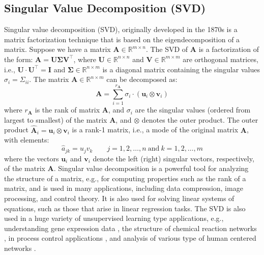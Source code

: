 \documentclass{article}[11pt]
\def\R{\mathbb{R}}
\begin{document}
\subsection{Singular Value Decomposition (SVD)}
Singular value decomposition (SVD), originally developed in the 1870s \citep{Stewart:1993} is a matrix factorization technique that is based on the eigendecomposition of a matrix.
Suppose we have a matrix $\mathbf{A} \in \R^{m \times n}$. The SVD of $\mathbf{A}$ is a factorization of the form: $\mathbf{A} = \mathbf{U}\mathbf{\Sigma}\mathbf{V}^{\top}$, where
$\mathbf{U}\in\mathbb{R}^{n\times{n}}$ and $\mathbf{V}\in\mathbb{R}^{m\times{m}}$ are orthogonal matrices, i.e., $\mathbf{U}\cdot\mathbf{U}^{\top} = \mathbf{I}$ and $\mathbf{\Sigma}\in\mathbb{R}^{n\times{m}}$ is a diagonal matrix containing 
the singular values $\sigma_{i}=\Sigma_{ii}$. The matrix $\mathbf{A}\in\mathbb{R}^{n\times{m}}$ can be decomposed as:
\begin{equation}
\mathbf{A} = \sum_{i=1}^{r_{\mathbf{A}}}\sigma_{i}\cdot\left(\mathbf{u}_{i}\otimes\mathbf{v}_{i}\right)
\end{equation}
where $r_{\mathbf{A}}$ is the rank of matrix $\mathbf{A}$, and $\sigma_{i}$ are the singular values (ordered from largest to smallest) of the matrix $\mathbf{A}$,
and $\otimes$ denotes the outer product. 
The outer product $\hat{\mathbf{A}}_{i} = \mathbf{u}_{i}\otimes\mathbf{v}_{i}$ is a rank-1 matrix, i.e., a mode of the original matrix $\mathbf{A}$,  with elements: 
\begin{equation}
\hat{a}_{jk} = u_{j}v_{k}\qquad{j=1,2,\dots,n~\text{and}~k=1,2,\dots,m}
\end{equation}
where the vectors $\mathbf{u}_{i}$ and $\mathbf{v}_{i}$ denote the left (right) singular vectors, respectively, of the matrix $\mathbf{A}$.
Singular value decomposition is a powerful tool for analyzing the structure of a matrix, e.g., for computing properties such as the rank of a matrix, and is used in many applications, 
including data compression, image processing, and control theory. It is also used for solving linear systems of equations,
such as those that arise in linear regression tasks. The SVD is also used in a huge variety of unsupervised learning type applications, e.g., understanding gene expression data \citep{Alter:2000aa, Alter:2006},  
the structure of chemical reaction networks \citep{Famili:2003aa}, 
in process control applications \citep{MooreSVD1986}, and analysis of various type of human centered networks \citep{SASTRY20075275, 7993780}.



\end{document}
